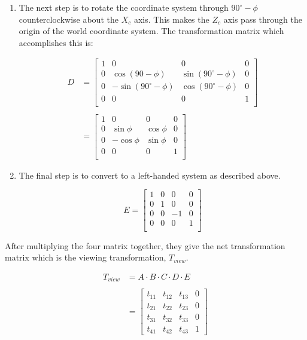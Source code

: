 \begin{enumerate}
	\item  The next step is to rotate the coordinate system through
	$90^{\circ} -\phi$ counterclockwise about the $X_c$ axis.  This makes
	the $Z_c$ axis pass through the origin of the world coordinate
	system.  The transformation matrix which accomplishes this is:

		\[ \begin{array}{ll}
			D & = \left[  \begin{array}{cccc}
				1 & 0 & 0 & 0 \\
				0 & \cos(90 - \phi) & \sin(90^{\circ}-\phi) & 0 \\
				0 & -\sin(90^{\circ}-\phi) & \cos(90^{\circ}-\phi) & 0 \\
				0 & 0 & 0 & 1 \\
					\end{array}
			  \right] \\ \\
			& = \left[  \begin{array}{cccc}
				1 & 0 & 0 & 0 \\
				0 & \sin\phi & \cos\phi & 0 \\
				0 & -\cos\phi & \sin\phi & 0 \\
				0 & 0 & 0 & 1 \\
					\end{array}
			  \right] 
		  \end{array}
		\]


	\item The final step is to convert to a left-handed system as
		described above.

		\[ E = \left[  \begin{array}{cccc}
					1 & 0 & 0 & 0 \\
					0 & 1 & 0 & 0 \\
					0 & 0 & -1 & 0 \\
					0 & 0 & 0 & 1 \\
					\end{array}
			  \right] \]
\end{enumerate}

After multiplying the four matrix together, they give the net
transformation matrix which is the viewing transformation, $T_{view}$.

  \[ \begin{array}{ll}
	T_{view} & = A \cdot B \cdot C \cdot D \cdot E \\ \\
		& = \left[ \begin{array}{cccc}
				t_{11} & t_{12} & t_{13} & 0 \\ 
				t_{21} & t_{22} & t_{23} & 0 \\
				t_{31} & t_{32} & t_{33} & 0 \\
				t_{41} & t_{42} & t_{43} & 1
				\end{array}
		\right] 
	\end{array}
  \]

